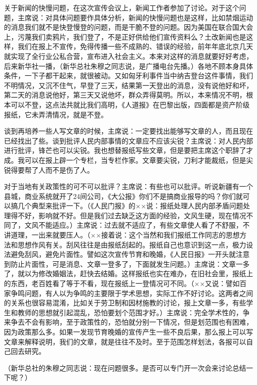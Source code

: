 关于新闻的快慢问题，在这次宣传会议上，新闻工作者参加了讨论。对于这个问题，主席说：对具体问题要作具体分析，新闻的快慢问题也是这样，比如禁烟运动的消息我们就不是快登慢登的问题，而是干脆不登的问题。因为美国在联合国大会上，污蔑我们卖鸦片，我们登了，不是正好供给他们宣传资料么？土改新闻也是这样，我们在报上不宣传，免得传播一些不成熟的、错误的经验，前年年底北京几天就实现了全行业公私合营，宣布进入社会主义。本来对这样的消息就要好好考虑，后来新华社一播，（新华总社朱穆之同志说，是广播电台先播。）各地不顾本身具体条件，一下子都干起来，就很被动。又如匈牙利事件当中纳吉登台这件事情，我们不明情况，又沉不住气，早登了三天，结果第一天登出的消息，没有说他好和坏，第二天的消息说他好，第三天又说他坏，群众弄得莫明。所以，本来情况不明，根本可以不登，这点法共就比我们高明，《人道报》在巴黎出版，四面都是资产阶级报纸，它未弄清情况，就是不登。

谈到再培养一些人写文章的时候，主席说：一定要找出能够写文章的人，而且现在已经找出了些。谈到批评人民内部事情的文章应不应该尖锐？主席说：对人民内部进行批评，锋芒也可以尖锐。我也想替报纸写些文章，但是要把主席这个职辞了才成。我可以在报上辟一个专栏，当专栏作家。文章要尖锐，刀利才能裁纸，但是尖锐得要帮了人而不是伤了人。

对于当地有关政策性的可不可以批评？主席说：有些也可以批评。听说新疆有一个县城，商业系统就开了24间公司，《大公报》你们不是搞商业报导的吗？你们就可以搞几个典型来批评一下。（《人民门报》的××说：报纸处理人民内部矛盾问题处理得不好，影响就不好。但是我们过去缺乏这方面的经验，文风生硬，现在情况不同了，文风不能适应。）主席说：过去就不适应了，有些文章使人看了不舒服，不讲道理，一出来就要压人。（××接着说：这个当然和我们报纸工作同志的思想方法和思想作风有关。刮风往往是由报纸刮起的。报纸自己也意识到这一点，极力设法避免刮风，避免片面性。譬如这次宣传节育和晚婚，《人民日报》一开头就注意到防止片面性，可是消息、文章一登多了，下面就发生问题。）主席说：文章一多了，就以为修改婚姻法，赶快去结婚。这样报纸也实在难办，在旧社会里，报纸上的东西，老百姓看了等于不看，现在报纸上一登情况可不同。（××又说：譬如百家争鸣问题，有人以为争鸣的主要限于学术思想，实际工作不好讨论。这两者之间的关系也很容易混淆，比如关于劳卫制和因材施教的讨论，报上文章一多，有些学生和教师的思想就引起混乱，恐怕要划个范围才好。）主席说：完全学术性的，争来争去不会有影响，至于政策性的，恐怕就分别一下情况，但是划范围也有困难，因为政策那么多。如果一发现节育晚婚的宣传产生一些不良后果，那么报上可以写文章来解释说明，我们的文章，就是往往不及时。至于范围怎样划法，各报可以自己回去研究。

（新华总社的朱穆之同志说：现在问题很多。是否可以专门开一次会来讨论总结一下呢？）

